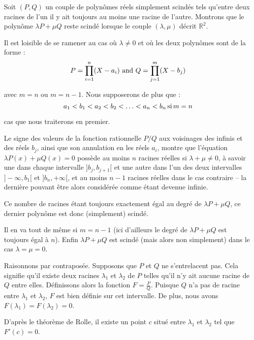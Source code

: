 
Soit $(P, Q)$ un couple de polyn{\^o}mes r{\'e}els simplement scind{\'e}s tels
qu'entre deux racines de l'un il y ait toujours au moins une racine de
l'autre. Montrons que le polyn{\^o}me $\lambda P + \mu Q$ reste scind{\'e}
lorsque le couple $(\lambda, \mu)$ d{\'e}crit $\mathbb{R}^2$.

Il est loisible de se ramener au cas o{\`u} $\lambda \neq 0$ et o{\`u} les
deux polyn{\^o}mes sont de la forme :
\[ P = \prod_{i = 1}^n (X - a_i) \text{ and } Q = \prod_{j = 1}^m (X - b_j) \]


avec $m = n$ ou $m = n - 1$. Nous supposerons de plus que :
\[ a_1 < b_1 < a_2 < b_2 < \ldots < a_n < b_n \operatorname{si} m = n \]


cas que nous traiterons en premier.

Le signe des valeurs de la fonction rationnelle $P / Q$ aux voisinages des
infinis et des r{\'e}els $b_j$, ainsi que son annulation en les r{\'e}els
$a_i$, montre que l'{\'e}quation $\lambda P (x) + \mu Q (x) = 0$ poss{\`e}de
au moins $n$ racines r{\'e}elles si $\lambda + \mu \neq 0$, {\`a} savoir une
dans chaque intervalle $] b_j, b_{j + 1} [$ et une autre dans l'un des deux
intervalles $] - \infty, b_1 [$ et $] b_n, + \infty [$, et au moins $n - 1$
racines r{\'e}elles dans le cas contraire -- la derni{\`e}re pouvant {\^e}tre
alors consid{\'e}r{\'e}e comme {\'e}tant devenue infinie.

Ce nombre de racines {\'e}tant toujours exactement {\'e}gal au degr{\'e} de
$\lambda P + \mu Q$, ce dernier polyn{\^o}me est donc (simplement) scind{\'e}.

Il en va tout de m{\^e}me si $m = n - 1$ (ici d'ailleurs le degr{\'e} de
$\lambda P + \mu Q$ est toujours {\'e}gal {\`a} $n$). Enfin $\lambda P + \mu
Q$ est scind{\'e} (mais alors non simplement) dans le cas $\lambda = \mu = 0$.


Raisonnons par contrapos{\'e}e. Supposons que $P$ et $Q$ ne s'entrelacent pas.
Cela signifie qu'il existe deux racines $\lambda_1$ et $\lambda_2$ de $P$
telles qu'il n'y ait aucune racine de $Q$ entre elles. D{\'e}finissons alors
la fonction $F = \frac{P}{Q}$. Puisque $Q$ n'a pas de racine entre $\lambda_1$
et $\lambda_2$, $F$ est bien d{\'e}finie sur cet intervalle. De plus, nous
avons $F (\lambda_1) = F (\lambda_2) = 0$.

D'apr{\`e}s le th{\'e}or{\`e}me de Rolle, il existe un point $c$ situ{\'e}
entre $\lambda_1$ et $\lambda_2$ tel que $F' (c) = 0$.

